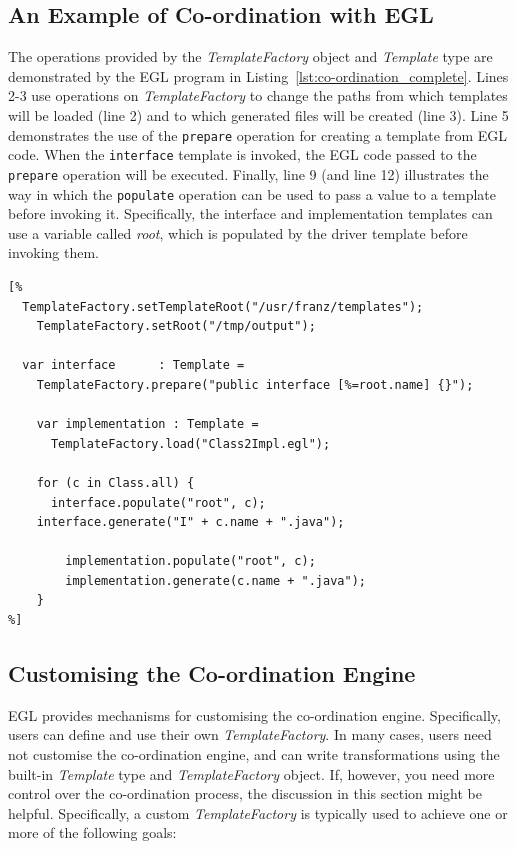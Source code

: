 \subsection{An Example of Co-ordination with EGL}
\label{sec:example_of_co-ordination}
The operations provided by the \emph{TemplateFactory} object and \emph{Template} type are demonstrated by the EGL program in Listing~\ref{lst:co-ordination_complete}. Lines 2-3 use operations on \emph{TemplateFactory} to change the paths from which templates will be loaded (line 2) and to which generated files will be created (line 3). Line 5 demonstrates the use of the \texttt{prepare} operation for creating a template from EGL code. When the \texttt{interface} template is invoked, the EGL code passed to the \texttt{prepare} operation will be executed. Finally, line 9 (and line 12) illustrates the way in which the \texttt{populate} operation can be used to pass a value to a template before invoking it. Specifically, the interface and implementation templates can use a variable called \emph{root}, which is populated by the driver template before invoking them.

\begin{lstlisting}[basicstyle=\ttfamily\footnotesize, language=EGL, tabsize=2, flexiblecolumns=true, caption=Using the various operations provided by the Template type and TemplateFactory object., label=lst:co-ordination_complete]
[%
  TemplateFactory.setTemplateRoot("/usr/franz/templates");
	TemplateFactory.setRoot("/tmp/output");

  var interface      : Template =
    TemplateFactory.prepare("public interface [%=root.name] {}");
	
	var implementation : Template = 
	  TemplateFactory.load("Class2Impl.egl");

	for (c in Class.all) {
	  interface.populate("root", c);	
  	interface.generate("I" + c.name + ".java");
		
		implementation.populate("root", c);
		implementation.generate(c.name + ".java");
	}
%]
\end{lstlisting}

\subsection{Customising the Co-ordination Engine}
\label{sec:custom_co-ordination}
EGL provides mechanisms for customising the co-ordination engine. Specifically,
users can define and use their own \emph{TemplateFactory}. In many cases, 
users need not customise the co-ordination engine, and can write transformations
using the built-in \emph{Template} type and \emph{TemplateFactory} object. If, 
however, you need more control over the co-ordination process, the discussion in
this section might be helpful. Specifically, a custom \emph{TemplateFactory} 
is typically used to achieve one or more of the following goals:


